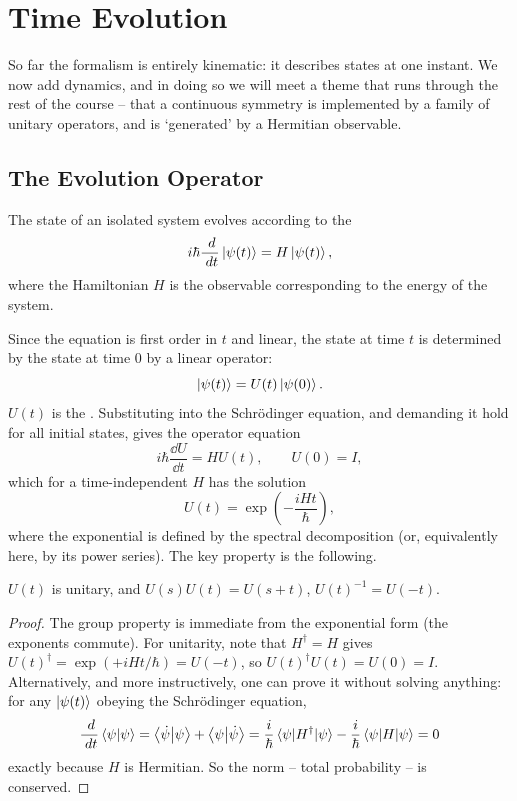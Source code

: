 \documentclass[a4paper]{scrartcl}
\begin{document}
\section{Time Evolution}

So far the formalism is entirely kinematic: it describes states at one instant. We now add dynamics, and in doing so we will meet a theme that runs through the rest of the course -- that a continuous symmetry is implemented by a family of unitary operators, and is `generated' by a Hermitian observable.

\subsection{The Evolution Operator}

\begin{axiom}
    The state of an isolated system evolves according to the 
    $$
    i \hbar \frac{\; d}{\; d t} \ket{\psi(t)} = H \ket{\psi(t)},
    $$
    where the Hamiltonian $H$ is the observable corresponding to the energy of the system.
\end{axiom}

Since the equation is first order in $t$ and linear, the state at time $t$ is determined by the state at time $0$ by a linear operator:
$$
\ket{\psi(t)} = U(t) \ket{\psi(0)}.
$$
$U(t)$ is the . Substituting into the Schr\"odinger equation, and demanding it hold for all initial states, gives the operator equation
$$
i\hbar \frac{\dd U}{\dd t} = H U(t), \qquad U(0) = I,
$$
which for a time-independent $H$ has the solution
$$
U(t) = \exp\left(-\frac{i H t}{\hbar}\right),
$$
where the exponential is defined by the spectral decomposition (or, equivalently here, by its power series). The key property is the following.

\begin{proposition}
    $U(t)$ is unitary, and $U(s)U(t) = U(s+t)$, $U(t)^{-1} = U(-t)$.
\end{proposition}
\begin{proof}
    The group property is immediate from the exponential form (the exponents commute). For unitarity, note that $H^\dagger = H$ gives $U(t)^\dagger = \exp(+iHt/\hbar) = U(-t)$, so $U(t)^\dagger U(t) = U(0) = I$. Alternatively, and more instructively, one can prove it without solving anything: for any $\ket{\psi(t)}$ obeying the Schr\"odinger equation,
    $$
    \frac{\; d}{\; d t}\braket{\psi}{\psi} = \braket{\dot\psi}{\psi} + \braket{\psi}{\dot\psi} = \frac{i}{\hbar}\mel{\psi}{H^\dagger}{\psi} - \frac{i}{\hbar}\mel{\psi}{H}{\psi} = 0
    $$
    exactly because $H$ is Hermitian. So the norm -- total probability -- is conserved.
\end{proof}
\end{document}
